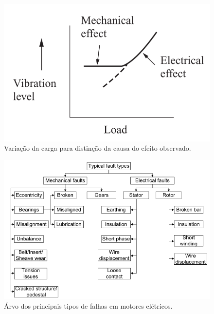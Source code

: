 \begin{figure}[H]
    \caption{Variação da carga para distinção da causa do efeito observado.}
    \begin{center}
        \includegraphics[scale=.45]{referencial/img/fault_effect_randall_p54.png}
    \end{center}
    \label{fig:}
\end{figure}


\begin{figure}[H]
    \caption{Árvo dos principais tipos de falhas em motores elétricos.}
    \begin{center}
        \includegraphics[scale=.5]{referencial/img/faults_rilski_p77.png}
    \end{center}
    \label{fig:}
\end{figure}


